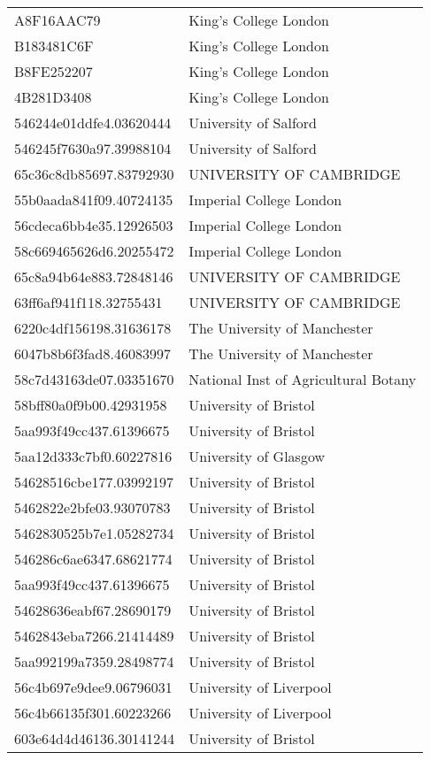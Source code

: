 \begin{tabular}{ll}
A8F16AAC79 & King's College London \\
B183481C6F & King's College London \\
B8FE252207 & King's College London \\
4B281D3408 & King's College London \\
546244e01ddfe4.03620444 & University of Salford \\
546245f7630a97.39988104 & University of Salford \\
65c36c8db85697.83792930 & UNIVERSITY OF CAMBRIDGE \\
55b0aada841f09.40724135 & Imperial College London \\
56cdeca6bb4e35.12926503 & Imperial College London \\
58c669465626d6.20255472 & Imperial College London \\
65c8a94b64e883.72848146 & UNIVERSITY OF CAMBRIDGE \\
63ff6af941f118.32755431 & UNIVERSITY OF CAMBRIDGE \\
6220c4df156198.31636178 & The University of Manchester \\
6047b8b6f3fad8.46083997 & The University of Manchester \\
58c7d43163de07.03351670 & National Inst of Agricultural Botany \\
58bff80a0f9b00.42931958 & University of Bristol \\
5aa993f49cc437.61396675 & University of Bristol \\
5aa12d333c7bf0.60227816 & University of Glasgow \\
54628516cbe177.03992197 & University of Bristol \\
5462822e2bfe03.93070783 & University of Bristol \\
5462830525b7e1.05282734 & University of Bristol \\
546286c6ae6347.68621774 & University of Bristol \\
5aa993f49cc437.61396675 & University of Bristol \\
54628636eabf67.28690179 & University of Bristol \\
5462843eba7266.21414489 & University of Bristol \\
5aa992199a7359.28498774 & University of Bristol \\
56c4b697e9dee9.06796031 & University of Liverpool \\
56c4b66135f301.60223266 & University of Liverpool \\
603e64d4d46136.30141244 & University of Bristol \\

\end{tabular}
